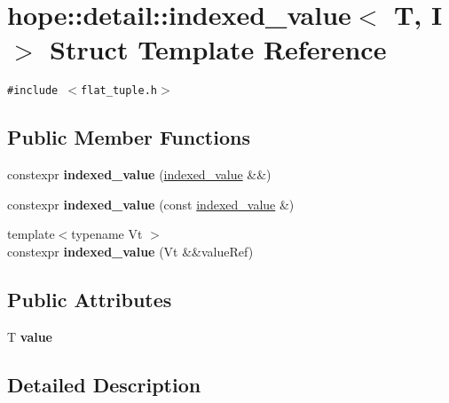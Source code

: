 \hypertarget{structhope_1_1detail_1_1indexed__value}{
\section{hope::detail::indexed\_\-value$<$ T, I $>$ Struct Template Reference}
\label{structhope_1_1detail_1_1indexed__value}
}
{\tt \#include $<$flat\_\-tuple.h$>$}

\subsection*{Public Member Functions}
\begin{CompactItemize}
\item 
\hypertarget{structhope_1_1detail_1_1indexed__value_1b6c7b5dd263af891d13662b4ff2cccf}{
constexpr \textbf{indexed\_\-value} (\hyperlink{structhope_1_1detail_1_1indexed__value}{indexed\_\-value} \&\&)}
\label{structhope_1_1detail_1_1indexed__value_1b6c7b5dd263af891d13662b4ff2cccf}

\item 
\hypertarget{structhope_1_1detail_1_1indexed__value_2610b3bc501995c8336937fe911491d8}{
constexpr \textbf{indexed\_\-value} (const \hyperlink{structhope_1_1detail_1_1indexed__value}{indexed\_\-value} \&)}
\label{structhope_1_1detail_1_1indexed__value_2610b3bc501995c8336937fe911491d8}

\item 
\hypertarget{structhope_1_1detail_1_1indexed__value_89da4a70ebc26a757646484af7673030}{
{\footnotesize template$<$typename Vt $>$ }\\constexpr \textbf{indexed\_\-value} (Vt \&\&valueRef)}
\label{structhope_1_1detail_1_1indexed__value_89da4a70ebc26a757646484af7673030}

\end{CompactItemize}
\subsection*{Public Attributes}
\begin{CompactItemize}
\item 
\hypertarget{structhope_1_1detail_1_1indexed__value_b07effb8e8df844a470f645393f55fc5}{
T \textbf{value}}
\label{structhope_1_1detail_1_1indexed__value_b07effb8e8df844a470f645393f55fc5}

\end{CompactItemize}


\subsection{Detailed Description}
